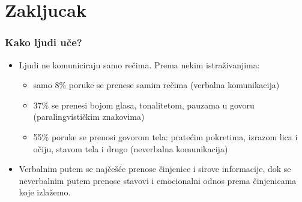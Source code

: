 \documentclass{beamer}
\begin{document}
\section{Zakljucak}

\begin{frame}[fragile]\frametitle{Kako ljudi uče?}
	\begin{itemize}	
		\item Ljudi ne komuniciraju samo rečima. Prema nekim
		istraživanjima:
		\begin{itemize}
			\item samo 8\% poruke se prenese samim rečima (verbalna komunikacija)
			\item 37\% se prenesi bojom glasa, tonalitetom, pauzama u govoru (paralingvističkim znakovima)
			\item 55\% poruke se prenosi govorom tela: pratećim pokretima, izrazom lica i
			očiju, stavom tela i drugo (neverbalna komunikacija)
		\end{itemize}
		\item Verbalnim putem se najčešće prenose činjenice i
		sirove informacije, dok se neverbalnim putem prenose stavovi i
		emocionalni odnos prema činjenicama koje izlažemo.
	\end{itemize}
\end{frame}
\end{document}
